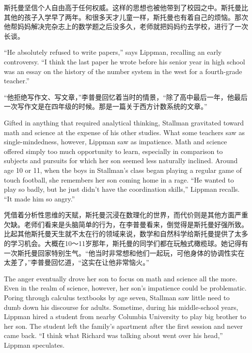 \ifdefined\chs
斯托曼坚信个人自由高于任何权威。这样的思想也被他带到了校园之中。斯托曼比其他的孩子入学早了两年。和很多天才儿童一样，斯托曼也有着自己的烦恼。那次他帮妈妈解决完杂志上的数学题之后没多久，老师就把妈妈约去学校，进行了一次长谈。
\fi

\ifdefined\eng
``He absolutely refused to write papers,'' says Lippman, recalling an early controversy. ``I think the last paper he wrote before his senior year in high school was an essay on the history of the number system in the west for a fourth-grade teacher.''
\fi

\ifdefined\chs
``他拒绝写作文、写文章，''李普曼回忆着当时的情景，``除了高中最后一年，他最后一次写作文是在四年级的时候。那是一篇关于西方计数系统的文章。''
\fi

\ifdefined\eng
Gifted in anything that required analytical thinking, Stallman gravitated toward math and science at the expense of his other studies. What some teachers saw as single-mindedness, however, Lippman saw as impatience. Math and science offered simply too much opportunity to learn, especially in comparison to subjects and pursuits for which her son seemed less naturally inclined. Around age 10 or 11, when the boys in Stallman's class began playing a regular game of touch football, she remembers her son coming home in a rage. ``He wanted to play so badly, but he just didn't have the coordination skills,'' Lippman recalls. ``It made him so angry.''
\fi

\ifdefined\chs
凭借着分析性思维的天赋，斯托曼沉浸在数理化的世界，而代价则是其他方面严重欠缺。老师们看来是头脑简单的行为，在李普曼看来，倒觉得是斯托曼好强所致。比起其他斯托曼天生就不太在行的领域来说，数学和自然科学给斯托曼提供了太多的学习机会。大概在10～11岁那年，斯托曼的同学们都在玩触式橄榄球。她记得有一次斯托曼回家特别生气。``他当时非常想和他们一起玩，可他身体的协调性实在太差了，''李普曼回忆道，``这实在让他非常恼火。''
\fi

\ifdefined\eng
The anger eventually drove her son to focus on math and science all the more. Even in the realm of science, however, her son's impatience could be problematic. Poring through calculus textbooks by age seven, Stallman saw little need to dumb down his discourse for adults. Sometime, during his middle-school years, Lippman hired a student from nearby Columbia University to play big brother to her son. The student left the family's apartment after the first session and never came back. ``I think what Richard was talking about went over his head,'' Lippman speculates.
\fi

